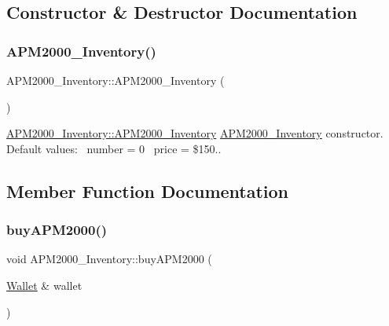 \subsection{Constructor \& Destructor Documentation}
\mbox{\label{classAPM2000__Inventory_a0aa6a0abe496ccd0ee773c4a3ce38a2c}} 
\subsubsection{\texorpdfstring{APM2000\_Inventory()}{APM2000\_Inventory()}}
{\footnotesize\ttfamily A\+P\+M2000\+\_\+\+Inventory\+::\+A\+P\+M2000\+\_\+\+Inventory (\begin{DoxyParamCaption}{ }\end{DoxyParamCaption})}



\mbox{\hyperlink{classAPM2000__Inventory_a0aa6a0abe496ccd0ee773c4a3ce38a2c}{A\+P\+M2000\+\_\+\+Inventory\+::\+A\+P\+M2000\+\_\+\+Inventory}} \mbox{\hyperlink{classAPM2000__Inventory}{A\+P\+M2000\+\_\+\+Inventory}} constructor.~\newline
Default values\+:~\newline
number = 0~\newline
price = \$150.. 



\subsection{Member Function Documentation}
\mbox{\label{classAPM2000__Inventory_a5f89890fced248efa0792e0ac062e9e2}} 
\subsubsection{\texorpdfstring{buyAPM2000()}{buyAPM2000()}}
{\footnotesize\ttfamily void A\+P\+M2000\+\_\+\+Inventory\+::buy\+A\+P\+M2000 (\begin{DoxyParamCaption}\item[{\mbox{\hyperlink{classWallet}{Wallet}} \&}]{wallet }\end{DoxyParamCaption})}



